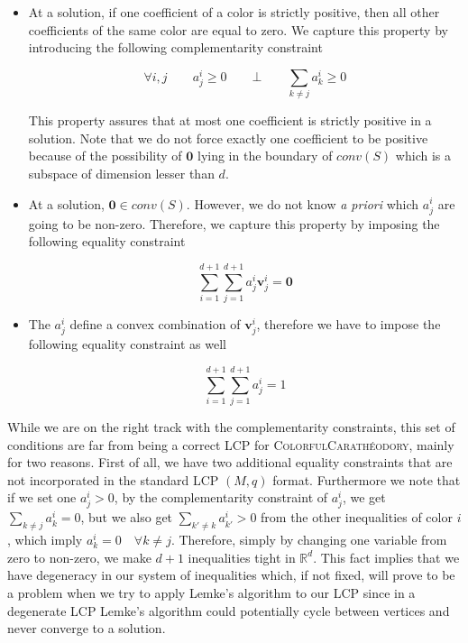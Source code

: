\documentclass[a4paper,11pt]{article}
\def\problem#1{\textsc{#1}}
\def\org{\bm{0}}
\def\v{\textbf{v}}
\def\CCP{\problem{ColorfulCarath\'eodory}\xspace}
\begin{document}
\begin{itemize}
\item At a solution, if one coefficient of a color is strictly positive, then all other coefficients of the same
color are equal to zero. We capture this property by introducing the following complementarity constraint

\[
\forall i, j \qquad a^i_j \geq 0 \qquad \bot \qquad \sum_{k \neq j} {a^i_k} \geq 0
\]

This property assures that at most one coefficient is strictly positive in a solution. Note that we do not force
exactly one coefficient to be positive because of the possibility of $\org$ lying in the boundary of $conv(S)$
which is a subspace of dimension lesser than $d$.

\item At a solution, $\org \in conv(S)$. However, we do not know \textit{a priori} which $a^i_j$ are going to be
non-zero. Therefore, we capture this property by imposing the following equality constraint

\[
\sum_{i = 1}^{d+1} { \sum_{j = 1}^{d+1} {a^i_j \v^i_j } } = \org
\]

\item The $a^i_j$ define a convex combination of $\v^i_j$, therefore we have to impose the following equality
constraint as well

\[
\sum_{i = 1}^{d+1} { \sum_{j = 1}^{d+1} {a^i_j} } = 1
\]
\end{itemize}

\par While we are on the right track with the complementarity constraints, this set of conditions are far from being
a correct LCP for \CCP, mainly for two reasons. First of all, we have two additional equality constraints that are
not incorporated in the standard LCP $(M, q)$ format. Furthermore we note that if we set one $a^i_j > 0$, by the
complementarity constraint of $a^i_j$, we get $\sum_{k \neq j} {a^i_k} = 0$, but we also get
$\sum_{k' \neq k} {a^i_{k'}} > 0$ from the other inequalities of color $i$, which imply
$a^i_k = 0 \quad \forall k \neq j$. Therefore, simply by changing one variable from zero to non-zero, we make $d + 1$
inequalities tight in $\mathbb{R}^d$. This fact implies that we have degeneracy in our system of inequalities which,
if not fixed, will prove to be a problem when we try to apply Lemke's algorithm to our LCP since in a degenerate LCP
Lemke's algorithm could potentially cycle between vertices and never converge to a solution.
\end{document}
